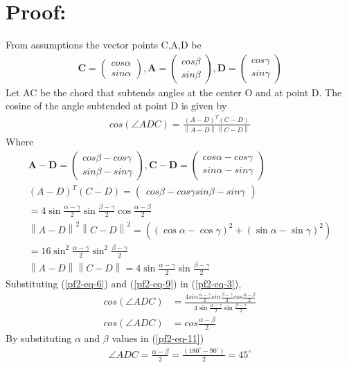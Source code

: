 \documentclass[12pt]{article}
\providecommand{\norm}[1]{\left\lVert#1\right\rVert}
\newcommand{\myvec}[1]{\ensuremath{\begin{pmatrix}#1\end{pmatrix}}}
\let\vec\mathbf
\begin{document}
\section*{Proof:}
From assumptions the vector points C,A,D be
\begin{align}
	\vec{C} = \myvec{cos\alpha\\sin\alpha},
	\vec{A} = \myvec{cos\beta\\sin\beta},
	\vec{D} = \myvec{cos\gamma\\sin\gamma}
\end{align}
Let AC be the chord that subtends angles at the center O and at point D. The cosine of the angle subtended at point D is given by
\begin{align}
	cos(\angle ADC) = \frac{(A-D)^T(C-D)}{\norm{A-D}\norm{C-D}}
	\label{pf2-eq-3}
\end{align}
Where
 \begin{align}
	\vec{A-D} = \myvec{cos\beta - cos\gamma\\sin\beta - sin\gamma},
	\vec{C-D} = \myvec{cos\alpha - cos\gamma\\sin\alpha - sin\gamma}\\
	(A-D)^T(C-D)=\myvec{cos\beta - cos\gamma  sin\beta - sin\gamma}\\
	\label{pf2-eq-6}
	= 4\sin\frac{\alpha-\gamma}2\sin\frac{\beta-\gamma}2\cos\frac{\alpha-\beta}2\\
	\norm{A-D}^2\norm{C-D}^2 = ((\cos\alpha-\cos\gamma)^2+(\sin\alpha-\sin\gamma)^2)\\
	= 16 \sin^2\frac{\alpha-\gamma}2\sin^2\frac{\beta-\gamma}2\\
	\norm{A-D}\norm{C-D} = 4 \sin\frac{\alpha-\gamma}2\sin\frac{\beta-\gamma}2
	\label{pf2-eq-9}
\end{align}
Substituting (\ref{pf2-eq-6}) and (\ref{pf2-eq-9}) in (\ref{pf2-eq-3}),
\begin{align}
	cos(\angle ADC) &= \frac{4sin\frac{\alpha-\gamma}{2}sin\frac{\beta-\gamma}{2}cos\frac{\alpha-\beta}{2}}{4 \sin\frac{\alpha-\gamma}2\sin\frac{\beta-\gamma}2}\\
	cos(\angle ADC) &= cos\frac{\alpha-\beta}{2}
	\label{pf2-eq-11}
\end{align}
By substituting $\alpha$ and $\beta$ values in (\ref{pf2-eq-11})
\begin{align}
\angle ADC = \frac{\alpha-\beta}{2}=\frac{(180^\circ - 90^\circ )}{2}=45^\circ
\end{align}
\end{document}
